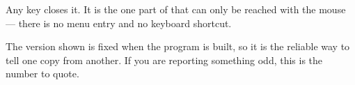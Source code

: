\begin{ccfigure}
\caption{The About box}
\label{fig:about}
\end{ccfigure}

Any key closes it. It is the one part of \ccprod{} that can only be reached with
the mouse --- there is no menu entry and no keyboard shortcut.

\begin{ccnote}
The version shown is fixed when the program is built, so it is the reliable way
to tell one copy from another. If you are reporting something odd, this is the
number to quote.
\end{ccnote}
